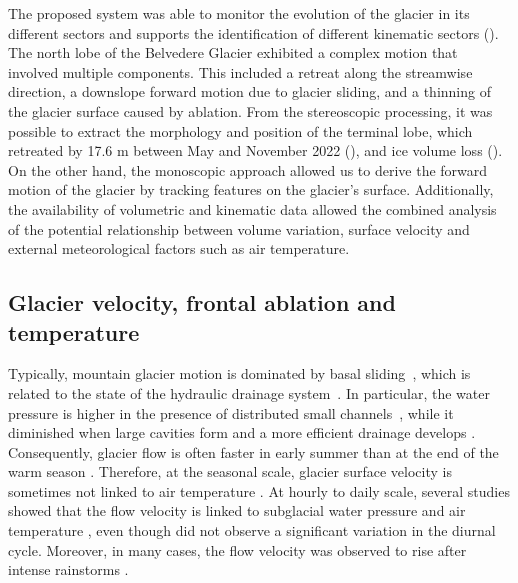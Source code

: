 The proposed system was able to monitor the evolution of the glacier in its different sectors and supports the identification of different kinematic sectors
(). 
The north lobe of the Belvedere Glacier exhibited a complex motion that involved multiple components.
This included a retreat along the streamwise direction, a downslope forward motion due to glacier sliding, and a thinning of the glacier surface caused by ablation.
From the stereoscopic processing, it was possible to extract the morphology and position of the terminal lobe, which retreated by 17.6 m between May and November 2022
(), and ice volume loss ().
On the other hand, the monoscopic approach allowed us to derive the forward motion of the glacier by tracking features on the glacier's surface.
Additionally, the availability of volumetric and kinematic data allowed the combined analysis of the potential relationship between volume variation, surface
velocity and external meteorological factors such as air temperature.

\subsection{Glacier velocity, frontal ablation and
  temperature}\label{sec:4:discuss_velocity_ablation_temperature}

Typically, mountain glacier motion is dominated by basal sliding~\citep{willis1995intra}, which is related to the state of the hydraulic drainage
system~\citep{vincent2016sliding}.
In particular, the water pressure is higher in the presence of distributed small channels~\citep{pimentel2011numerical}, while it diminished when large cavities form and
a more efficient drainage develops \citep{nienow2005hydrological}.
Consequently, glacier flow is often faster in early summer than at the end of the warm season \citep{sanders2018variations,vincent2016sliding}.
Therefore, at the seasonal scale, glacier surface velocity is sometimes not linked to air temperature \citep{sanders2018variations}.
At hourly to daily scale, several studies showed that the flow velocity is linked to subglacial water pressure \citep{sugiyama2010surface} and air temperature \citep{liu2019diurnal}, even though \citet{allstadt2015observations} did not observe a significant variation in the diurnal cycle.
Moreover, in many cases, the flow velocity was observed to rise after intense rainstorms \citep{benoit2015multi,horgan2015glacier,sugiyama2010surface}.

